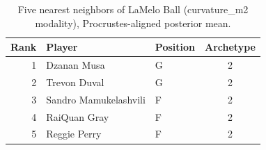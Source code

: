 \begin{table}[htbp]
  \centering\small
  \begin{tabular}{rllc}
    \toprule
    Rank & Player & Position & Archetype \\
    \midrule
    1 & Dzanan Musa & G & 2 \\
    2 & Trevon Duval & G & 2 \\
    3 & Sandro Mamukelashvili & F & 2 \\
    4 & RaiQuan Gray & F & 2 \\
    5 & Reggie Perry & F & 2 \\
    \bottomrule
  \end{tabular}
  \caption{Five nearest neighbors of LaMelo Ball (curvature_m2 modality), Procrustes-aligned posterior mean.}
  \label{tab:LaMelo_Ball_neighbors_curvature_m2}
\end{table}

